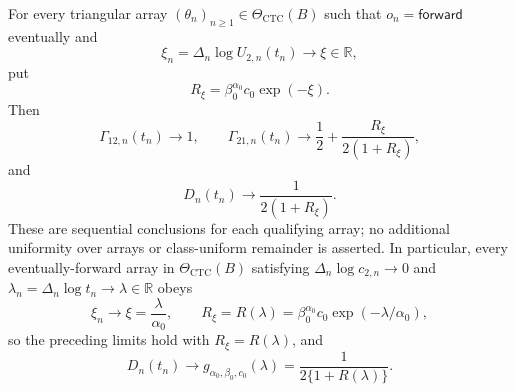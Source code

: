 For every triangular array \((\theta_n)_{n\geq1}\in\Theta_{\mathrm{CTC}}(B)\) such that \(o_n=\mathsf{forward}\) eventually and
\[
\xi_n=\Delta_n\log U_{2,n}(t_n)\longrightarrow\xi\in\mathbb R,
\]
put
\[
R_\xi=\beta_0^{\alpha_0}c_0\exp(-\xi).
\]
Then
\[
\Gamma_{12,n}(t_n)\longrightarrow1,
\qquad
\Gamma_{21,n}(t_n)\longrightarrow
\frac12+\frac{R_\xi}{2(1+R_\xi)},
\]
and
\[
D_n(t_n)\longrightarrow\frac{1}{2(1+R_\xi)}.
\]
These are sequential conclusions for each qualifying array; no additional uniformity over arrays or class-uniform remainder is asserted. In particular, every eventually-forward array in \(\Theta_{\mathrm{CTC}}(B)\) satisfying \(\Delta_n\log c_{2,n}\to0\) and \(\lambda_n=\Delta_n\log t_n\to\lambda\in\mathbb R\) obeys
\[
\xi_n\longrightarrow\xi=\frac{\lambda}{\alpha_0},
\qquad
R_\xi=R(\lambda)=\beta_0^{\alpha_0}c_0\exp(-\lambda/\alpha_0),
\]
so the preceding limits hold with \(R_\xi=R(\lambda)\), and
\[
D_n(t_n)\longrightarrow g_{\alpha_0,\beta_0,c_0}(\lambda)
=\frac{1}{2\{1+R(\lambda)\}}.
\]